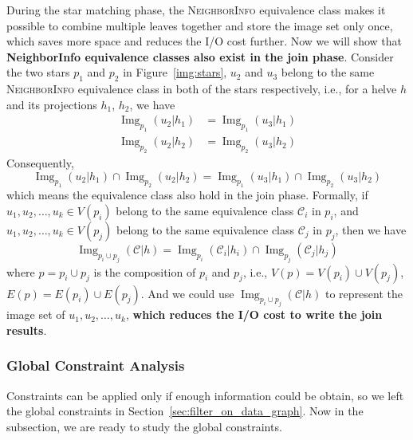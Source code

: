 During the star matching phase, the \textsc{NeighborInfo} equivalence class makes it possible to combine multiple leaves together and store the image set only once, which saves more space and reduces the I/O cost further.
Now we will show that \textbf{NeighborInfo equivalence classes also exist in the join phase}.
Consider the two stars $p_1$ and $p_2$ in Figure~\ref{img:stars},
$u_2$ and $u_3$ belong to the same \textsc{NeighborInfo} equivalence class in both of the stars respectively,
i.e., for a helve $h$ and its projections $h_1$, $h_2$,
we have
\begin{align*}
  \operatorname{Img}_{p_1}(u_2 | h_1) &= \operatorname{Img}_{p_1}(u_3 | h_1) \\
  \operatorname{Img}_{p_2}(u_2 | h_2) &= \operatorname{Img}_{p_2}(u_3 | h_2)
\end{align*}
Consequently,
\[\operatorname{Img}_{p_1}(u_2 | h_1) \cap \operatorname{Img}_{p_2}(u_2 | h_2) = \operatorname{Img}_{p_1}(u_3 | h_1) \cap \operatorname{Img}_{p_2}(u_3 | h_2)\]
which means the equivalence class also hold in the join phase.
Formally, if $u_1, u_2, \dots, u_k \in V(p_i)$ belong to the same equivalence class $\mathcal{C}_i$ in $p_i$,
and $u_1, u_2, \dots, u_k \in V(p_j)$ belong to the same equivalence class $\mathcal{C}_j$ in $p_j$,
then we have
\[ \operatorname{Img}_{p_i \cup p_j}(\mathcal{C} | h) = \operatorname{Img}_{p_i}(\mathcal{C}_i | h_i) \cap \operatorname{Img}_{p_j}(\mathcal{C}_j | h_j) \]
where $p = p_i \cup p_j$ is the composition of $p_i$ and $p_j$, i.e.,
$V(p) = V(p_i) \cup V(p_j)$, $E(p) = E(p_i) \cup E(p_j)$.
And we could use $\operatorname{Img}_{p_i \cup p_j}(\mathcal{C} | h)$ to represent the image set of $u_1, u_2, \dots, u_k$,
\textbf{which reduces the I/O cost to write the join results}.
\subsubsection{Global Constraint Analysis}\label{sec:global_constraint_analysis}
Constraints can be applied only if enough information could be obtain,
so we left the global constraints in Section~\ref{sec:filter_on_data_graph}.
Now in the subsection, we are ready to study the global constraints.

